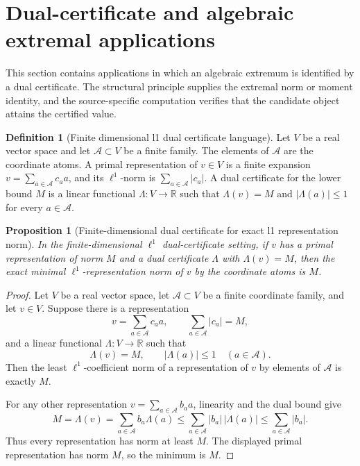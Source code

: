 \documentclass[11pt]{article}
\numberwithin{equation}{section}
\newtheorem{proposition}[theorem]{Proposition}
\theoremstyle{definition}
\newtheorem{definition}{Definition}[section]
\theoremstyle{remark}
\newcommand{\1}{\mathbf 1}
\begin{document}
\section{Dual-certificate and algebraic extremal applications}
\label{sec:dual-certificate-and-algebraic-extremal-applications}
This section contains applications in which an algebraic extremum is identified by a dual certificate.  The structural principle supplies the extremal norm or moment identity, and the source-specific computation verifies that the candidate object attains the certified value.

\begin{definition}[Finite dimensional l1 dual certificate language]
\label{res:finite-dimensional-l1-dual-certificate-language}
Let \(V\) be a real vector space and let \(\mathcal A\subset V\) be a finite family. The elements of \(\mathcal A\) are the coordinate atoms. A primal representation of \(v\in V\) is a finite expansion \(v=\sum_{a\in\mathcal A} c_a a\), and its \(\ell^1\)-norm is \(\sum_{a\in\mathcal A}|c_a|\). A dual certificate for the lower bound \(M\) is a linear functional \(\Lambda:V\to\mathbb R\) such that \(\Lambda(v)=M\) and \(|\Lambda(a)|\le1\) for every \(a\in\mathcal A\).
\end{definition}

\begin{proposition}[Finite-dimensional dual certificate for exact l1 representation norm]
\label{res:dual-certificate-extremal-l1-norm-principle}
In the finite-dimensional \(\ell^1\) dual-certificate setting, if \(v\) has a primal representation of norm \(M\) and a dual certificate \(\Lambda\) with \(\Lambda(v)=M\), then the exact minimal \(\ell^1\)-representation norm of \(v\) by the coordinate atoms is \(M\).
\end{proposition}

\begin{proof}
Let \(V\) be a real vector space, let \(\mathcal A\subset V\) be a finite coordinate family, and let \(v\in V\). Suppose there is a representation
\[
v=\sum_{a\in\mathcal A} c_a a,
\qquad
\sum_{a\in\mathcal A}|c_a|=M,
\]
and a linear functional \(\Lambda:V\to\mathbb R\) such that
\[
\Lambda(v)=M,
\qquad
|\Lambda(a)|\le 1\quad(a\in\mathcal A).
\]
Then the least \(\ell^1\)-coefficient norm of a representation of \(v\) by elements of \(\mathcal A\) is exactly \(M\).

For any other representation \(v=\sum_{a\in\mathcal A} b_a a\), linearity and the dual bound give
\[
M=\Lambda(v)=\sum_{a\in\mathcal A}b_a\Lambda(a)
\le \sum_{a\in\mathcal A}|b_a|\,|\Lambda(a)|
\le \sum_{a\in\mathcal A}|b_a|.
\]
Thus every representation has norm at least \(M\). The displayed primal representation has norm \(M\), so the minimum is \(M\).
\end{proof}
\end{document}
